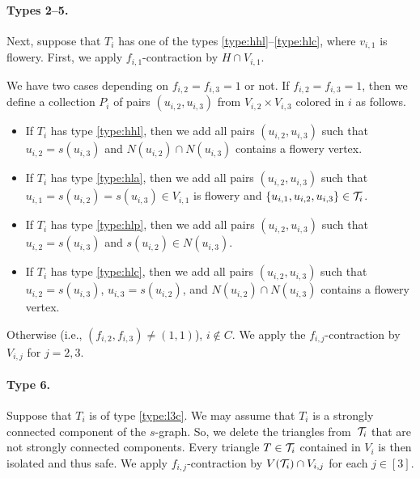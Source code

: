 \paragraph*{Types 2--5.}
Next, suppose that $T_i$ has one of the types \ref{type:hhl}--\ref{type:hlc}, where $v_{i, 1}$ is flowery.
First, we apply $f_{i,1}$-contraction by $H \cap V_{i,1}$.

We have two cases depending on $f_{i,2} = f_{i,3} = 1$ or not.
If $f_{i,2} = f_{i,3} = 1$, then we define a collection $P_i$ of pairs $(u_{i,2}, u_{i,3})$ from $V_{i,2} \times V_{i,3}$ colored in $i$ as follows.
\begin{itemize}
  \item If $T_i$ has type \ref{type:hhl}, then we add all pairs $(u_{i,2}, u_{i,3})$ such that $u_{i,2} = s(u_{i,3})$ and $N(u_{i,2}) \cap N(u_{i,3})$ contains a flowery vertex.
  \item If $T_i$ has type \ref{type:hla}, then we add all pairs $(u_{i,2}, u_{i,3})$ such that $u_{i,1} = s(u_{i,2}) = s(u_{i,3}) \in V_{i,1}$ is flowery and $\{ u_{i,1}, u_{i,2}, u_{i,3} \} \in \mathcal T_i$.
  \item If $T_i$ has type \ref{type:hlp}, then we add all pairs $(u_{i,2}, u_{i,3})$ such that $u_{i,2} = s(u_{i,3})$ and $s(u_{i,2}) \in N(u_{i,3})$.
  \item If $T_i$ has type \ref{type:hlc}, then we add all pairs $(u_{i,2}, u_{i,3})$ such that $u_{i,2} = s(u_{i,3})$, $u_{i,3} = s(u_{i,2})$, and $N(u_{i,2}) \cap N(u_{i,3})$ contains a flowery vertex.
\end{itemize}
Otherwise (i.e., $(f_{i,2}, f_{i,3}) \ne (1, 1)$), $i \notin C$.
We apply the $f_{i,j}$-contraction by $V_{i,j}$ for $j = 2, 3$.

\paragraph*{Type 6.}
  Suppose that $T_i$ is of type \ref{type:l3c}.
  We may assume that $T_i$ is a strongly connected component of the $s$-graph.
  So, we delete the triangles from~$\mathcal T_i$ that are not strongly connected components.
  Every triangle $T \in \mathcal T_i$ contained in $V_i$ is then isolated and thus safe.
  We apply $f_{i,j}$-contraction by $V(\mathcal T_i) \cap V_{i,j}$ for each $j \in [3]$.

